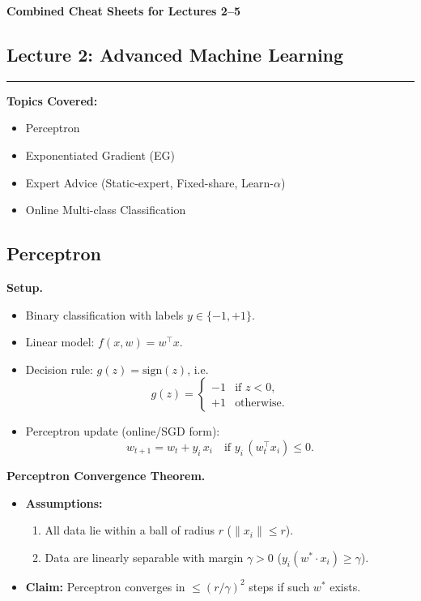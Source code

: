 \documentclass[10pt]{article}
\begin{document}
\begin{center}
  {\Large \textbf{Combined Cheat Sheets for Lectures 2--5}}
\end{center}
\vspace{0.5em}

\begin{multicols}{2}

\section*{Lecture 2: Advanced Machine Learning}
\vspace{-0.5em}
\hrule
\vspace{1em}

\textbf{Topics Covered:}
\begin{itemize}
\item Perceptron
\item Exponentiated Gradient (EG)
\item Expert Advice (Static-expert, Fixed-share, Learn-$\alpha$)
\item Online Multi-class Classification
\end{itemize}

\subsection*{Perceptron}

\textbf{Setup.}
\begin{itemize}
\item Binary classification with labels $y \in \{-1, +1\}$.
\item Linear model: $f(x, w) = w^\top x$.
\item Decision rule: $g(z) = \mathrm{sign}(z)$, i.e.
\[
g(z) = 
\begin{cases}
-1 & \text{if } z<0,\\
+1 & \text{otherwise}.
\end{cases}
\]
\item Perceptron update (online/SGD form):
\[
w_{t+1} = w_{t} + y_i \, x_i
\quad
\text{if } y_i \,(w_t^\top x_i) \le 0.
\]
\end{itemize}

\textbf{Perceptron Convergence Theorem.}
\begin{itemize}
\item \textbf{Assumptions:} 
  \begin{enumerate}
    \item All data lie within a ball of radius $r$ ($\|x_i\| \le r$).
    \item Data are linearly separable with margin $\gamma>0$ ($y_i (w^* \cdot x_i) \ge \gamma$).
  \end{enumerate}
\item \textbf{Claim:} Perceptron converges in $\le (r/\gamma)^2$ steps if such $w^*$ exists.
\end{itemize}


\end{multicols}
\end{document}
